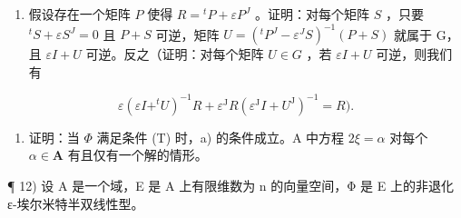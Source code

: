 \begin{enumerate}
\def\labelenumi{\alph{enumi})}
\tightlist
\item
  假设存在一个矩阵 \(P\) 使得 \(R = {}^t P + \varepsilon P^J\) 。证明：对每个矩阵 \(S\) ，只要 \({}^t S + \varepsilon S^J = 0\) 且 \(P + S\) 可逆，矩阵 \(U = (^{t}P^{J} - \varepsilon^{J}S)^{-1}(P + S)\) 就属于 G，且 \(\varepsilon I + U\) 可逆。反之（证明：对每个矩阵 \(U \in G\) ，若 \(\varepsilon I + U\) 可逆，则我们有
\end{enumerate}

\[
\varepsilon (\varepsilon I + ^ {t} U) ^ {- 1} R + \varepsilon^ {\mathrm{J}} R (\varepsilon^ {\mathrm{J}} I + U ^ {\mathrm{J}}) ^ {- 1} = R).
\]

\begin{enumerate}
\def\labelenumi{\alph{enumi})}
\setcounter{enumi}{1}
\tightlist
\item
  证明：当 \(\Phi\) 满足条件 (T) 时，a) 的条件成立。A 中方程 \(2\xi = \alpha\) 对每个 \(\alpha \in \mathbf{A}\) 有且仅有一个解的情形。
\end{enumerate}

¶ 12) 设 A 是一个域，E 是 A 上有限维数为 n 的向量空间，Φ 是 E 上的非退化 ε-埃尔米特半双线性型。

